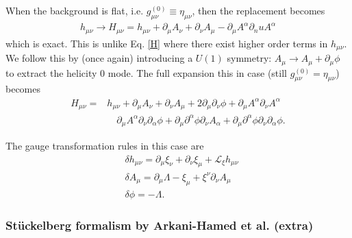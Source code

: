 \documentclass{book}
\theoremstyle{definition}
\newcommand{\p}{\partial}
\newcommand{\lag}{\mathcal{L}}
\newcommand{\nn}{\nonumber}
\newcommand{\al}{\alpha}
\begin{document}
When the background is flat, i.e. $g^{(0)}_{\mu\nu} \equiv \eta_{\mu\nu}$, then the replacement becomes
\begin{align}
\boxed{h_{\mu\nu} \to H_{\mu\nu} = h_{\mu\nu} + \p_\mu A_\nu + \p_\nu A_\mu - \p_\mu A^\al \p_nu A^\al}
\end{align}
which is exact. This is unlike Eq. \eqref{H} where there exist higher order terms in $h_{\mu\nu}$. \\

We follow this by (once again) introducing a $U(1)$ symmetry: $A_\mu \to A_\mu + \p_\mu \phi$ to extract the helicity 0 mode. The full expansion this in case (still $g^{(0)}_{\mu\nu} = \eta_{\mu\nu}$) becomes
\begin{align}
H_{\mu\nu} = &h_{\mu\nu} + \p_\mu A_\nu + \p_\nu A_\mu + 2\p_\mu\p_\nu \phi + \p_\mu A^\al \p_\nu A^\al \nn\\
&\quad  \p_\mu A^\al \p_\nu \p_\al \phi + \p_\mu \p^\al \phi \p_\nu A_\al + \p_\mu \p^\al \phi \p_\nu \p_\al \phi.
\end{align}

The gauge transformation rules in this case are
\begin{align}
&\delta h_{\mu\nu} = \p_\mu \xi_\nu + \p_\nu \xi_\mu  + \lag_\xi h_{\mu\nu}\\
&\delta A_\mu = \p_\mu \Lambda - \xi_\mu + \xi^\nu \p_\nu A_\mu\\
&\delta \phi = -\Lambda.
\end{align}









 




























\newpage

\subsubsection{St\"{u}ckelberg formalism by Arkani-Hamed et al. (extra)}
\end{document}
